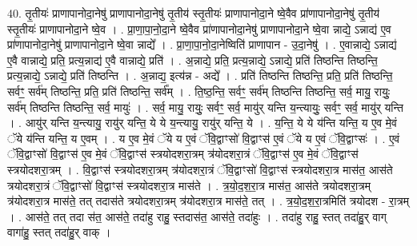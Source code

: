 \documentclass[17pt]{extarticle}
\begin{document}
40. तृ॒तीयः॑ प्राणापानोदा॒नेषु॑ प्राणापानोदा॒नेषु॑ तृ॒तीय॑ स्तृ॒तीयः॑ प्राणापानोदा॒ने ष्वे॒वैव प्रा॑णापानोदा॒नेषु॑ तृ॒तीय॑ स्तृ॒तीयः॑ प्राणापानोदा॒ने ष्वे॒व । . प्रा॒णा॒पा॒नो॒दा॒ने ष्वे॒वैव प्रा॑णापानोदा॒नेषु॑ प्राणापानोदा॒ने ष्वे॒वा न्नाद्ये॒ ऽन्नाद्य॑ ए॒व प्रा॑णापानोदा॒नेषु॑ प्राणापानोदा॒ने ष्वे॒वा न्नाद्ये᳚ । . प्रा॒णा॒पा॒नो॒दा॒नेष्विति॑ प्राणापान - उ॒दा॒नेषु॑ । . ए॒वान्नाद्ये॒ ऽन्नाद्य॑ ए॒वै वान्नाद्ये॒ प्रति॒ प्रत्य॒न्नाद्य॑ ए॒वै वान्नाद्ये॒ प्रति॑ । . अ॒न्नाद्ये॒ प्रति॒ प्रत्य॒न्नाद्ये॒ ऽन्नाद्ये॒ प्रति॑ तिष्ठन्ति तिष्ठन्ति॒ प्रत्य॒न्नाद्ये॒ ऽन्नाद्ये॒ प्रति॑ तिष्ठन्ति । . अ॒न्नाद्य॒ इत्य॑न्न - अद्ये᳚ । . प्रति॑ तिष्ठन्ति तिष्ठन्ति॒ प्रति॒ प्रति॑ तिष्ठन्ति॒ सर्वꣳ॒॒ सर्व॑म् तिष्ठन्ति॒ प्रति॒ प्रति॑ तिष्ठन्ति॒ सर्व᳚म् । . ति॒ष्ठ॒न्ति॒ सर्वꣳ॒॒ सर्व॑म् तिष्ठन्ति तिष्ठन्ति॒ सर्व॒ मायु॒ रायुः॒ सर्व॑म् तिष्ठन्ति तिष्ठन्ति॒ सर्व॒ मायुः॑ । . सर्व॒ मायु॒ रायुः॒ सर्वꣳ॒॒ सर्व॒ मायु॑र् यन्ति य॒न्त्यायुः॒ सर्वꣳ॒॒ सर्व॒ मायु॑र् यन्ति । . आयु॑र् यन्ति य॒न्त्यायु॒ रायु॑र् यन्ति॒ ये ये य॒न्त्यायु॒ रायु॑र् यन्ति॒ ये । . य॒न्ति॒ ये ये य॑न्ति यन्ति॒ य ए॒व मे॒वं ॅये य॑न्ति यन्ति॒ य ए॒वम् । . य ए॒व मे॒वं ॅये य ए॒वं ॅवि॒द्वाꣳसो॑ वि॒द्वाꣳस॑ ए॒वं ॅये य ए॒वं ॅवि॒द्वाꣳसः॑ । . ए॒वं ॅवि॒द्वाꣳसो॑ वि॒द्वाꣳस॑ ए॒व मे॒वं ॅवि॒द्वाꣳस॑ स्त्रयोदशरा॒त्रम् त्र॑योदशरा॒त्रं ॅवि॒द्वाꣳस॑ ए॒व मे॒वं ॅवि॒द्वाꣳस॑ स्त्रयोदशरा॒त्रम् । . वि॒द्वाꣳस॑ स्त्रयोदशरा॒त्रम् त्र॑योदशरा॒त्रं ॅवि॒द्वाꣳसो॑ वि॒द्वाꣳस॑ स्त्रयोदशरा॒त्र मास॑त॒ आस॑ते त्रयोदशरा॒त्रं ॅवि॒द्वाꣳसो॑ वि॒द्वाꣳस॑ स्त्रयोदशरा॒त्र मास॑ते । . त्र॒यो॒द॒श॒रा॒त्र मास॑त॒ आस॑ते त्रयोदशरा॒त्रम् त्र॑योदशरा॒त्र मास॑ते॒ तत् तदास॑ते त्रयोदशरा॒त्रम् त्र॑योदशरा॒त्र मास॑ते॒ तत् । . त्र॒यो॒द॒श॒रा॒त्रमिति॑ त्रयोदश - रा॒त्रम् । . आस॑ते॒ तत् तदा स॑त॒ आस॑ते॒ तदा॑हु राहु॒ स्तदास॑त॒ आस॑ते॒ तदा॑हुः । . तदा॑हु राहु॒ स्तत् तदा॑हु॒र् वाग् वागा॑हु॒ स्तत् तदा॑हु॒र् वाक् । \newline
\end{document}
